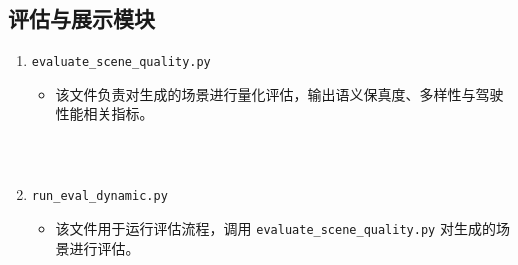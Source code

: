 \subsection*{评估与展示模块}
\begin{enumerate}
	\item \texttt{evaluate\_scene\_quality.py}
	\begin{itemize}
		\item 该文件负责对生成的场景进行量化评估，输出语义保真度、多样性与驾驶性能相关指标。
	\end{itemize}
	\begin{verbatim}
		
		
	\end{verbatim}
	
	\item \texttt{run\_eval\_dynamic.py}
	\begin{itemize}
		\item 该文件用于运行评估流程，调用 \texttt{evaluate\_scene\_quality.py} 对生成的场景进行评估。
	\end{itemize}
	\begin{verbatim}
		
		
	\end{verbatim}
\end{enumerate}